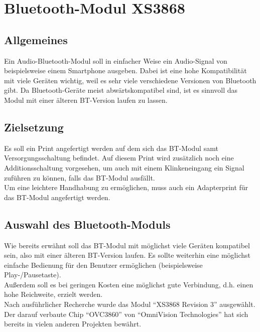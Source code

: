 \section{Bluetooth-Modul XS3868} \label{sec:4.1}
\subsection{Allgemeines} \label{subsec:4.1.1}
Ein Audio-Bluetooth-Modul soll in einfacher Weise ein Audio-Signal von beispielsweise einem Smartphone ausgeben. Dabei ist eine hohe Kompatibilität mit viele Geräten wichtig, weil es sehr viele verschiedene Versionen von Bluetooth gibt. Da Bluetooth-Geräte meist abwärtskompatibel sind, ist es sinnvoll das Modul mit einer älteren BT-Version laufen zu lassen.


\subsection{Zielsetzung} \label{subsec:4.1.2}
Es soll ein Print angefertigt werden auf dem sich das BT-Modul samt Versorgungsschaltung befindet. Auf diesem Print wird zusätzlich noch eine Additionsschaltung vorgesehen, um auch mit einem Klinkeneingang ein Signal zuführen zu können, falls das BT-Modul ausfällt.\\
Um eine leichtere Handhabung zu ermöglichen, muss auch ein Adapterprint für das BT-Modul angefertigt werden.


\subsection{Auswahl des Bluetooth-Moduls} \label{subsec:4.1.3}
Wie bereits erwähnt soll das BT-Modul mit möglichst viele Geräten kompatibel sein, also mit einer älteren BT-Version laufen. Es sollte weiterhin eine möglichst einfache Bedienung für den Benutzer ermöglichen (beispielsweise Play-/Pausetaste).\\
Außerdem soll es bei geringen Kosten eine möglichst gute Verbindung, d.h. einen hohe Reichweite, erzielt werden.\\
Nach ausführlicher Recherche wurde das Modul \enquote{XS3868 Revision 3} ausgewählt. Der darauf verbaute Chip \enquote{OVC3860} von \enquote{OmniVision Technologies} hat sich bereits in vielen anderen Projekten bewährt. 


\newpage
